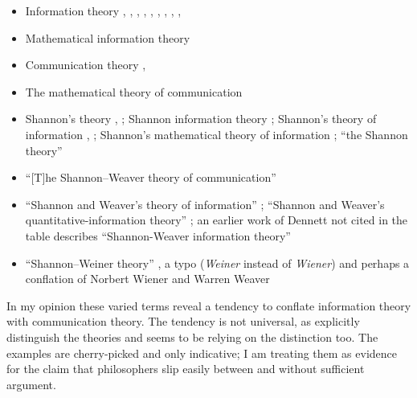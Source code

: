 \begin{itemize}
    \item Information theory \citep[p. 3 passim]{adriaans2019information}, \citep[12]{shea2018representation}, \citep[614]{timpson2006grammar}, \citep[2]{baker2021natural}, \citep[3]{kirchhoff2021universal}, \citep[$\S$6]{dennett2017bacteria}, \citep[1]{isaac2018semantics}, \citep[8]{godfrey-smith2016biological}, \citep[p. 777 as ``this formal information theory'']{owren2010redefining}, \citep[p. 1991 as ``the theory of information'']{lombardi2015shannon}
    \item Mathematical information theory \citep[1]{godfrey-smith2016biological}
    \item Communication theory \citep[592]{timpson2006grammar}, \citep[1987]{lombardi2015shannon}
    \item The mathematical theory of communication \citep[1988]{lombardi2015shannon}
    \item Shannon's theory \citep[2]{isaac2018semantics}, \citep[1984]{lombardi2015shannon}; Shannon information theory \citep[400]{lean2014shannon}; Shannon's theory of information \citep[p. 78, n. 5]{shea2018representation}, \citep[6]{isaac2018semantics}; Shannon's mathematical theory of information \citep[$\S$1.1]{dennett2017bacteria}; ``the Shannon theory'' \citep[p. 599 n. 15]{timpson2006grammar}
    \item ``[T]he Shannon–Weaver theory of communication'' \citep[p. 756 n. 3]{owren2010redefining}
    \item ``Shannon and Weaver's \parencite*{shannon1949mathematical} theory of information'' \citep[759]{owren2010redefining}; ``Shannon and Weaver's quantitative-information theory'' \citep[761]{owren2010redefining}; an earlier work of Dennett not cited in the table describes ``Shannon-Weaver information theory'' \citep[344]{dennett1983intentional}
    \item ``Shannon–Weiner theory'' \citep[19]{baker2021natural}, a typo (\textit{Weiner} instead of \textit{Wiener}) and perhaps a conflation of Norbert Wiener and Warren Weaver
\end{itemize}

\noindent In my opinion these varied terms reveal a tendency to conflate information theory with communication theory.
The tendency is not universal, as \citet[17-20]{piccinini2011information} explicitly distinguish the theories and \citet{rathkopf2017neural} seems to be relying on the distinction too.
The examples are cherry-picked and only indicative; I am treating them as evidence for the claim that philosophers slip easily between \ait{} and \act{} without sufficient argument.


